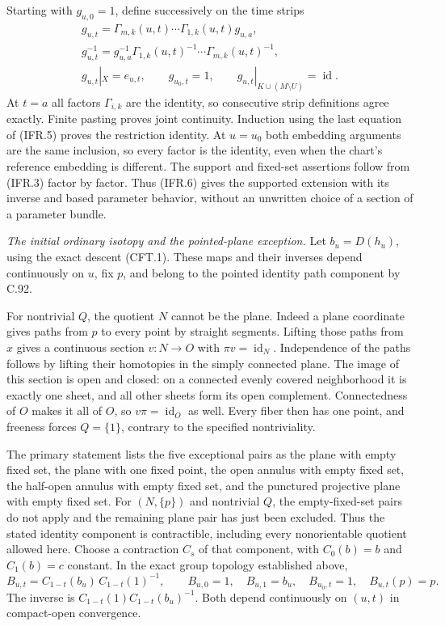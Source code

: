 \documentclass[11pt,a4paper]{article}
\DeclareMathOperator{\id}{id}\DeclareMathOperator{\im}{im}
\begin{document}
Starting with $g_{u,0}=1$, define successively on the time strips
\[
\begin{gathered}
 g_{u,t}=\Gamma_{m,k}(u,t)\cdots\Gamma_{1,k}(u,t)g_{u,a},\\
 g_{u,t}^{-1}=g_{u,a}^{-1}
                   \Gamma_{1,k}(u,t)^{-1}\cdots\Gamma_{m,k}(u,t)^{-1},\\
 g_{u,t}|_X=e_{u,t},\qquad g_{u_0,t}=1,\qquad
 g_{u,t}|_{K\cup(M\setminus U)}=\id.
\end{gathered}                                                    \tag{IFR.6}
\]
At $t=a$ all factors $\Gamma_{i,k}$ are the identity, so consecutive
strip definitions agree exactly. Finite pasting proves joint continuity.
Induction using the last equation of (IFR.5) proves the restriction
identity. At $u=u_0$ both embedding arguments are the same inclusion,
so every factor is the identity, even when the chart's reference
embedding is different. The support and fixed-set assertions follow
from (IFR.3) factor by factor. Thus (IFR.6) gives the supported
extension with its inverse and based parameter behavior, without an
unwritten choice of a section of a parameter bundle.

\emph{The initial ordinary isotopy and the pointed-plane exception.}
Let $b_u=D(h_u)$, using the exact descent (CFT.1). These maps and
their inverses depend continuously on $u$, fix $p$, and belong to
the pointed identity path component by C.92.

For nontrivial $Q$, the quotient $N$ cannot be the plane. Indeed a
plane coordinate gives paths from $p$ to every point by straight
segments. Lifting those paths from $x$ gives a continuous section
$v:N\to O$ with $\pi v=\id_N$. Independence of the paths follows
by lifting their homotopies in the simply connected plane.
The image of this section is open and closed: on a connected evenly
covered neighborhood it is exactly one sheet, and all other sheets
form its open complement. Connectedness of $O$ makes it all of $O$,
so $v\pi=\id_O$ as well. Every fiber then has one point, and freeness
forces $Q=\{1\}$, contrary to the specified nontriviality.

The primary statement
\cite[Theorem~1.1, p.~1]{C_Yagasaki2000} lists the five exceptional
pairs as the plane with empty fixed set, the plane with one fixed
point, the open annulus with empty fixed set, the half-open annulus
with empty fixed set, and the punctured projective plane with empty
fixed set. For $(N,\{p\})$ and nontrivial $Q$, the empty-fixed-set
pairs do not apply and the remaining plane pair has just been excluded.
Thus the stated identity component is contractible, including every
nonorientable quotient allowed here.
Choose a contraction $C_s$ of that component, with $C_0(b)=b$ and
$C_1(b)=c$ constant. In the exact group topology established above,
\[
 B_{u,t}=C_{1-t}(b_u)\,C_{1-t}(1)^{-1},\qquad
 B_{u,0}=1,\quad B_{u,1}=b_u,\quad B_{u_0,t}=1,
                  \quad B_{u,t}(p)=p.                          \tag{IFR.7}
\]
The inverse is $C_{1-t}(1)C_{1-t}(b_u)^{-1}$. Both depend
continuously on $(u,t)$ in compact-open convergence.
\end{document}

